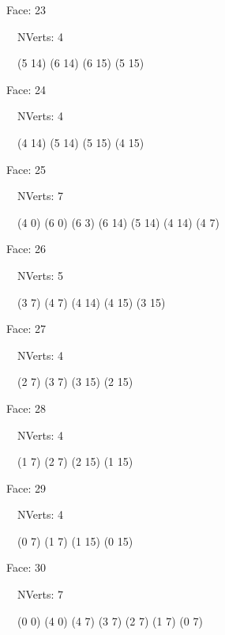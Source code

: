 \documentclass{article}
\begin{document}
{\footnotesize 

Face: 23

\   \    NVerts: 4

 \   \   (5 14) (6 14) (6 15) (5 15)}

{\footnotesize 

Face: 24

\   \    NVerts: 4

 \   \   (4 14) (5 14) (5 15) (4 15)}

{\footnotesize 

Face: 25

\   \    NVerts: 7

 \   \   (4 0) (6 0) (6 3) (6 14) (5 14) (4 14) (4 7)}

{\footnotesize 

Face: 26

\   \    NVerts: 5

 \   \   (3 7) (4 7) (4 14) (4 15) (3 15)}

{\footnotesize 

Face: 27

\   \    NVerts: 4

 \   \   (2 7) (3 7) (3 15) (2 15)}

{\footnotesize 

Face: 28

\   \    NVerts: 4

 \   \   (1 7) (2 7) (2 15) (1 15)}

{\footnotesize 

Face: 29

\   \    NVerts: 4

 \   \   (0 7) (1 7) (1 15) (0 15)}

{\footnotesize 

Face: 30

\   \    NVerts: 7

 \   \   (0 0) (4 0) (4 7) (3 7) (2 7) (1 7) (0 7)}


 \newpage
\end{document}

